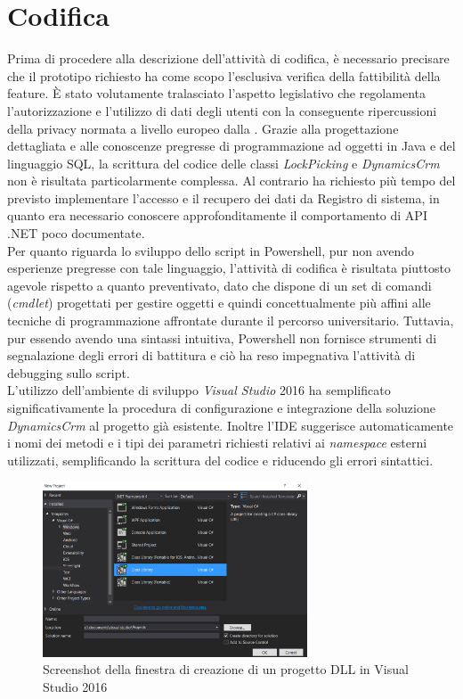 \section{Codifica}
Prima di procedere alla descrizione dell'attività di codifica, è necessario precisare che il prototipo richiesto ha come scopo l’esclusiva verifica della fattibilità della feature. È stato volutamente tralasciato l’aspetto legislativo che regolamenta l’autorizzazione e l’utilizzo di dati degli utenti con la conseguente ripercussioni della privacy normata a livello europeo dalla .
Grazie alla progettazione dettagliata e alle conoscenze pregresse di programmazione ad oggetti in Java e del linguaggio SQL, la scrittura del codice delle classi \emph{LockPicking} e \emph{DynamicsCrm} non è risultata particolarmente complessa. 
Al contrario ha richiesto più tempo del previsto implementare l'accesso e il recupero dei dati da Registro di sistema, in quanto era necessario conoscere approfonditamente il comportamento di API .NET poco documentate.\\
Per quanto riguarda lo sviluppo dello script in Powershell, pur non avendo esperienze pregresse con tale linguaggio, l'attività di codifica è risultata piuttosto agevole rispetto a quanto preventivato, dato che dispone di un set di comandi (\emph{cmdlet}) progettati per gestire oggetti e quindi concettualmente più affini alle tecniche di programmazione affrontate durante il percorso universitario. Tuttavia, pur essendo avendo una sintassi intuitiva, Powershell non fornisce strumenti di segnalazione degli errori di battitura e ciò ha reso impegnativa l'attività di debugging sullo script.\\
L'utilizzo dell'ambiente di sviluppo \emph{Visual Studio} 2016 ha semplificato significativamente la procedura di configurazione e integrazione della soluzione \emph{DynamicsCrm} al progetto già esistente. Inoltre l'IDE suggerisce automaticamente i nomi dei metodi e i tipi dei parametri richiesti relativi ai \emph{namespace} esterni utilizzati, semplificando la scrittura del codice e riducendo gli errori sintattici.
\begin{figure}[H]
\centering
\captionsetup{justification=centering,margin=2cm}
\includegraphics[width=0.7\textwidth ]{figures/dllvisual.png}
\caption [Screenshot creazione progetto DLL in Visual Studio 2016]{ Screenshot della finestra di creazione di un progetto DLL in Visual Studio 2016 \label{fig:dllvisual}}
\end{figure}
